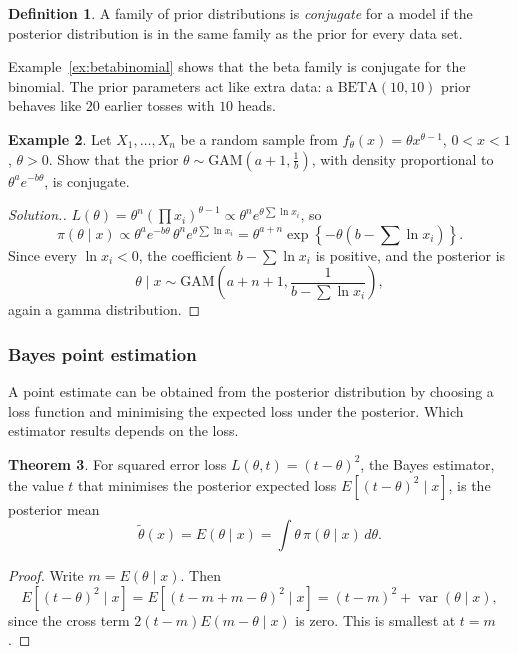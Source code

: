 \documentclass[12pt,a4paper]{report}
\theoremstyle{definition}
\newtheorem{thm}{Theorem}[section]
\newtheorem{defn}[thm]{Definition}
\newtheorem{exa}[thm]{Example}
\DeclareMathOperator{\var}{var}
\newenvironment{solution}
  {\renewcommand{\qedsymbol}{}\begin{proof}[\textit{Solution}.]}
  {\end{proof}}
\begin{document}
\begin{defn}
\label{def:conjugate}
A family of prior distributions is \emph{conjugate} for a model if the posterior
distribution is in the same family as the prior for every data set.
\end{defn}

Example~\ref{ex:betabinomial} shows that the beta family is conjugate for the
binomial. The prior parameters act like extra data: a $\text{BETA}(10, 10)$ prior
behaves like $20$ earlier tosses with $10$ heads.

\begin{exa}
\label{ex:gammaconjugate}
Let $X_1, \dots, X_n$ be a random sample from $f_\theta(x) = \theta x^{\theta - 1}$,
$0<x<1$, $\theta>0$. Show that the prior $\theta\sim\text{GAM}\left(a + 1, \frac1b\right)$,
with density proportional to $\theta^ae^{-b\theta}$, is conjugate.
\end{exa}

\begin{solution}
$L(\theta) = \theta^n\left(\prod x_i\right)^{\theta - 1}\propto\theta^n e^{\theta\sum\ln x_i}$, so
\[\pi(\theta\mid x)\propto\theta^ae^{-b\theta}\,\theta^ne^{\theta\sum\ln x_i}
= \theta^{a + n}\exp\left\{-\theta\left(b - \sum\ln x_i\right)\right\}.\]
Since every $\ln x_i<0$, the coefficient $b - \sum\ln x_i$ is positive, and the
posterior is
\[\theta\mid x\sim\text{GAM}\left(a + n + 1, \frac{1}{b - \sum\ln x_i}\right),\]
again a gamma distribution.
\end{solution}

\subsubsection{Bayes point estimation}

A point estimate can be obtained from the posterior distribution by choosing a loss
function and minimising the expected loss under the posterior. Which estimator
results depends on the loss.

\begin{thm}
\label{thm:bayessquared}
For squared error loss $L(\theta, t) = (t - \theta)^2$, the Bayes estimator, the value $t$
that minimises the posterior expected loss $E\left[(t - \theta)^2\mid x\right]$, is the
posterior mean
\[\tilde\theta(x) = E(\theta\mid x) = \int\theta\,\pi(\theta\mid x)\,d\theta .\]
\end{thm}

\begin{proof}
Write $m = E(\theta\mid x)$. Then
\[E\left[(t - \theta)^2\mid x\right] = E\left[(t - m + m - \theta)^2\mid x\right]
= (t - m)^2 + \var(\theta\mid x),\]
since the cross term $2(t - m)E(m - \theta\mid x)$ is zero. This is smallest at
$t = m$.
\end{proof}
\end{document}
